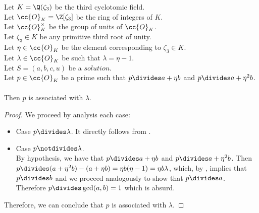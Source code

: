 \begin{lemma}
  \label{lmm:associated_of_dvd_a_add_eta_mul_b_of_dvd_a_add_eta_sq_mul_b}
  \leanok
  Let $K = \Q(\zeta_3)$ be the third cyclotomic field. \\
  Let $\cc{O}_K = \Z[\zeta_3]$ be the ring of integers of $K$. \\
  Let $\cc{O}^\times_K$ be the group of units of $\cc{O}_K$. \\
  Let $\zeta_3 \in K$ be any primitive third root of unity. \\
  Let $\eta \in \cc{O}_K$ be the element corresponding to $\zeta_3 \in K$. \\
  Let $\lambda \in \cc{O}_K$ be such that $\lambda = \eta -1$. \\
  Let $S=(a, b, c, u)$ be a $solution$.\\
  Let $p \in \cc{O}_K$ be a prime such that $p \divides a+\eta b$
  and $p \divides a+\eta^2  b$.\\\\
  Then $p$ is associated with $\lambda$.
\end{lemma}
\begin{proof}
  \leanok
  We proceed by analysis each case:
  \begin{itemize}
      \item Case $p \divides \lambda$. It directly follows from .
      \item Case $p \notdivides \lambda$. \\
            By hypothesis, we have that $p \divides a+\eta b$ and $p \divides a+\eta^2 b$.
            Then $p \divides (a+\eta^2 b) - (a+\eta b) = \eta b (\eta-1) = \eta b \lambda$,
            which, by , implies that $p \divides b$
            and we proceed analogously to show that $p \divides a$.\\
            Therefore $p \divides \gcd(a,b)=1$ which is absurd.
  \end{itemize}
  Therefore, we can conclude that $p$ is associated with $\lambda$.
\end{proof}

